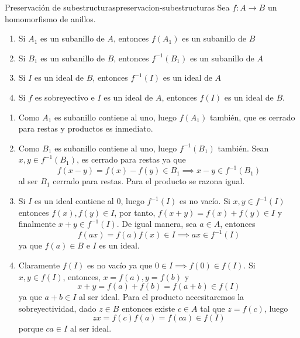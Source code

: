 \begin{proposition}{Preservación de subestructuras}{preservacion-subestructuras}
    Sea \(f: A \to B\) un homomorfismo de anillos.
    \begin{enumerate}
        \item Si \(A_1\) es un subanillo de \(A\), entonces \(f(A_1)\) es un subanillo de \(B\)
        \item Si \(B_1\) es un subanillo de \(B\), entonces \(f^{-1}(B_1)\) es un subanillo de \(A\)
        \item Si \(I\) es un ideal de \(B\), entonces \(f^{-1}(I)\) es un ideal de \(A\)
        \item Si \(f\) es sobreyectivo e \(I\) es un ideal de \(A\), entonces \(f(I)\) es un ideal de \(B\).
    \end{enumerate}
\end{proposition}

\begin{proofbox}
    \begin{enumerate}
        \item Como $A_1$ es subanillo contiene al uno, luego $f(A_1)$ también, que es cerrado para restas y productos es inmediato.
        \item Como $B_1$ es subanillo contiene al uno, luego $f^{-1}(B_1)$ también. Sean $x, y \in f^{-1}(B_1)$, es cerrado para restas ya que
        \[
            f(x - y) = f(x) - f(y) \in B_1 \implies x - y \in f^{-1}(B_1)
        \]
        al ser $B_1$ cerrado para restas. Para el producto se razona igual.
        \item Si \(I\) es un ideal contiene al $0$, luego \(f^{-1}(I)\) es no vacío. Si $x,y \in f^{-1}(I)$ entonces $f(x),f(y) \in I$, por tanto, $f(x + y) = f(x) + f(y) \in I$ y finalmente $x + y \in f^{-1}(I)$. De igual manera, sea $a \in A$, entonces
        \[
        f(ax) = f(a)f(x) \in I \implies ax \in f^{-1}(I)
        \]
        ya que $f(a) \in B$ e $I$ es un ideal.
        \item Claramente $f(I)$ es no vacío ya que $0\in I \implies f(0)\in f(I)$. Si $x,y \in f(I)$, entonces, $x = f(a), y = f(b)$ y 
        \[
        x + y = f(a) + f(b) = f(a + b) \in f(I)
        \]
        ya que $a + b \in I$ al ser ideal. Para el producto necesitaremos la sobreyectividad, dado $z \in B$ entonces existe $c\in A$ tal que $z = f(c)$, luego
        \[
        zx = f(c)f(a) = f(ca) \in f(I)
        \]
        porque $ca \in I$ al ser ideal.

    \end{enumerate}
\end{proofbox}

